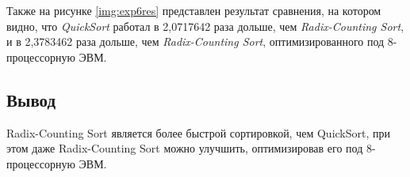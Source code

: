 


Также на рисунке \ref{img:exp6res} представлен результат сравнения, на котором
видно, что \textit{QuickSort} работал в 2,0717642 раза дольше, чем
\textit{Radix-Counting Sort}, и в 2,3783462 раза дольше, чем
\textit{Radix-Counting Sort}, оптимизированного под 8-процессорную ЭВМ.

\subsection{Вывод}

Radix-Counting Sort является более быстрой сортировкой, чем QuickSort, при этом
даже Radix-Counting Sort можно улучшить, оптимизировав его под 8-процессорную
ЭВМ.
